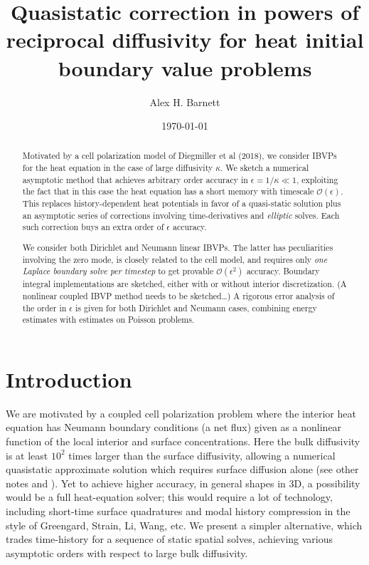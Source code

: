 \documentclass[10pt]{article}
\newcommand{\bigO}{{\mathcal O}}
\newcommand{\eps}{\epsilon}
\begin{document}
\title{Quasistatic correction in powers of reciprocal diffusivity for heat initial boundary value problems}


\author{Alex H. Barnett}
\date{\today}
\maketitle

\begin{abstract}
  Motivated by a cell polarization model of Diegmiller et al (2018),
  we consider IBVPs for the heat equation
  in the case of large diffusivity $\kappa$.
  We sketch a numerical asymptotic method
  that achieves arbitrary order accuracy in $\eps = 1/\kappa \ll 1$,
  exploiting the fact that in this case the heat equation has a short memory
  with timescale $\bigO(\eps)$.
  This replaces history-dependent heat potentials in favor of a
  quasi-static solution plus an asymptotic series of corrections
  involving time-derivatives and {\em elliptic} solves.
  Each such correction buys an extra order of $\eps$ accuracy.

  We consider both Dirichlet and Neumann linear IBVPs.  The latter has
  peculiarities involving the zero mode, is closely related to the cell
  model, and requires only {\em one Laplace boundary solve per
  timestep} to get provable $\bigO(\eps^2)$ accuracy.
  Boundary integral implementations are sketched, either with or
  without interior discretization.  (A nonlinear coupled IBVP method
  needs to be sketched\ldots)  A rigorous error analysis of the order in $\eps$
  is given for both Dirichlet and Neumann cases,
  combining energy estimates with estimates on Poisson problems.
\end{abstract}

\section{Introduction}

We are motivated by a coupled cell polarization problem \cite{diegmiller18}
where the interior heat equation has Neumann boundary conditions
(a net flux) given as a nonlinear function of the local interior and surface concentrations.
Here the bulk diffusivity is at least $10^2$ times larger than the surface diffusivity, allowing a
numerical quasistatic approximate solution which
requires surface diffusion alone (see other notes and \cite{diegmiller18}).
Yet to achieve higher accuracy, in general shapes in 3D,
a possibility would be a full heat-equation solver; this would require
a lot of technology, including short-time surface quadratures and modal history compression in the style of Greengard, Strain, Li, Wang, etc.
We present a simpler alternative, which trades time-history for
a sequence of static spatial solves,
achieving various asymptotic orders with respect to large bulk diffusivity.
\end{document}
